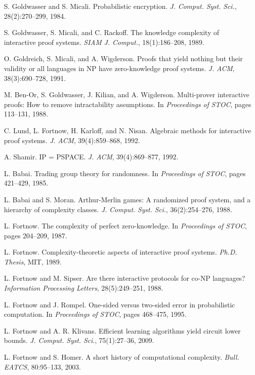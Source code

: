 \documentclass[11pt]{article}
\begin{document}
\begin{thebibliography}{99}
 S. Goldwasser and S. Micali. Probabilistic encryption. \emph{J. Comput. Syst. Sci.}, 28(2):270--299, 1984.

 S. Goldwasser, S. Micali, and C. Rackoff. The knowledge complexity of interactive proof systems. \emph{SIAM J. Comput.}, 18(1):186--208, 1989.

 O. Goldreich, S. Micali, and A. Wigderson. Proofs that yield nothing but their validity or all languages in NP have zero-knowledge proof systems. \emph{J. ACM}, 38(3):690--728, 1991.

 M. Ben-Or, S. Goldwasser, J. Kilian, and A. Wigderson. Multi-prover interactive proofs: How to remove intractability assumptions. In \emph{Proceedings of STOC}, pages 113--131, 1988.

 C. Lund, L. Fortnow, H. Karloff, and N. Nisan. Algebraic methods for interactive proof systems. \emph{J. ACM}, 39(4):859--868, 1992.

 A. Shamir. IP = PSPACE. \emph{J. ACM}, 39(4):869--877, 1992.

 L. Babai. Trading group theory for randomness. In \emph{Proceedings of STOC}, pages 421--429, 1985.

 L. Babai and S. Moran. Arthur-Merlin games: A randomized proof system, and a hierarchy of complexity classes. \emph{J. Comput. Syst. Sci.}, 36(2):254--276, 1988.

 L. Fortnow. The complexity of perfect zero-knowledge. In \emph{Proceedings of STOC}, pages 204--209, 1987.

 L. Fortnow. Complexity-theoretic aspects of interactive proof systems. \emph{Ph.D. Thesis}, MIT, 1989.

 L. Fortnow and M. Sipser. Are there interactive protocols for co-NP languages? \emph{Information Processing Letters}, 28(5):249--251, 1988.

 L. Fortnow and J. Rompel. One-sided versus two-sided error in probabilistic computation. In \emph{Proceedings of STOC}, pages 468--475, 1995.

 L. Fortnow and A. R. Klivans. Efficient learning algorithms yield circuit lower bounds. \emph{J. Comput. Syst. Sci.}, 75(1):27--36, 2009.

 L. Fortnow and S. Homer. A short history of computational complexity. \emph{Bull. EATCS}, 80:95--133, 2003.


\end{thebibliography}
\end{document}
